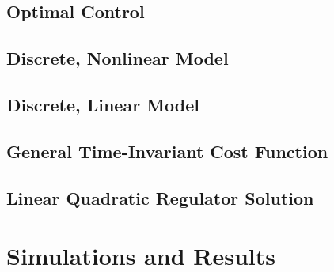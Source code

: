 \documentclass[journal]{IEEEtran}
\begin{document}
\subsection{Optimal Control}

\subsection{Discrete, Nonlinear Model}

\subsection{Discrete, Linear Model}

\subsection{General Time-Invariant Cost Function}

\subsection{Linear Quadratic Regulator Solution}

\section{Simulations and Results}






%
%
\end{document}
